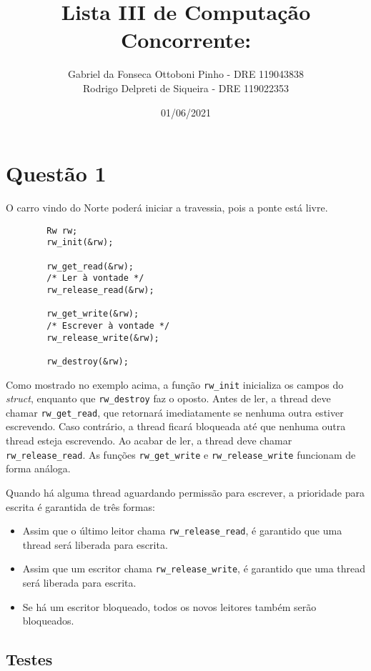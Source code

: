 \documentclass[12pt]{article}
\title{Lista III de Computação Concorrente:}
\author{Gabriel da Fonseca Ottoboni Pinho - DRE 119043838\\
	Rodrigo Delpreti de Siqueira - DRE 119022353}
\date{01/06/2021}
\begin{document}
	\maketitle
	\newpage
	
	\section{Questão 1}
	O carro vindo do Norte poderá iniciar a travessia,
	pois a ponte está livre.
	
	\newpage
	\begin{verbatim}
		Rw rw;
		rw_init(&rw);
		
		rw_get_read(&rw);
		/* Ler à vontade */
		rw_release_read(&rw);
		
		rw_get_write(&rw);
		/* Escrever à vontade */
		rw_release_write(&rw);
		
		rw_destroy(&rw);
	\end{verbatim}
	
	Como mostrado no exemplo acima,
	a função \texttt{rw\_init}
	inicializa os campos do \textit{struct},
	enquanto que \texttt{rw\_destroy} faz o oposto.
	Antes de ler,
	a thread deve chamar \texttt{rw\_get\_read},
	que retornará imediatamente
	se nenhuma outra estiver escrevendo.
	Caso contrário, a thread ficará bloqueada
	até que nenhuma outra thread esteja escrevendo.
	Ao acabar de ler,
	a thread deve chamar \texttt{rw\_release\_read}.
	As funções \texttt{rw\_get\_write} e \texttt{rw\_release\_write}
	funcionam de forma análoga.
	
	Quando há alguma thread aguardando permissão para escrever,
	a prioridade para escrita é garantida de três formas:
	\begin{itemize}
		\item Assim que o último leitor chama \texttt{rw\_release\_read},
		é garantido que uma thread será liberada para escrita.
		\item Assim que um escritor chama \texttt{rw\_release\_write},
		é garantido que uma thread será liberada para escrita.
		\item Se há um escritor bloqueado, todos os novos leitores
		também serão bloqueados.
	\end{itemize}
	
	\newpage
	\subsection{Testes}
	
\end{document}
